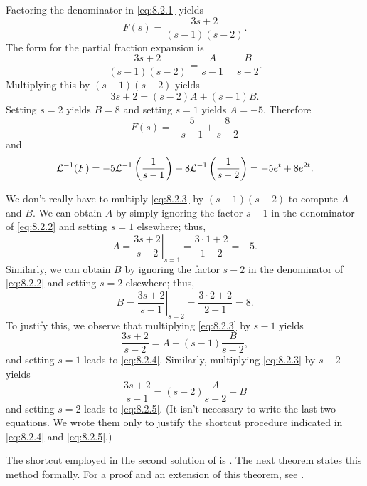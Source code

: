 \begin{enumext}[label=\arabic*,wrap-label={\scshape Solution (Method #1)},labelwidth=11em,list-indent=0pt]
\item
 Factoring the denominator in  \eqref{eq:8.2.1} yields
\begin{equation}\label{eq:8.2.2}
F(s)=\frac{3s+2}{(s-1)(s-2)}.
\end{equation}
The form for the partial fraction expansion is
\begin{equation}\label{eq:8.2.3}
\frac{3s+2}{(s-1)(s-2)}=\frac{A}{s-1}+\frac{B}{s-2}.
\end{equation}
Multiplying  this by $(s-1)(s-2)$ yields
\[
3s+2=(s-2)A+(s-1)B.
\]
Setting $s=2$ yields $B=8$ and setting $s=1$ yields $A=-5$. Therefore
\[
F(s)=-\frac{5}{s-1}+\frac{8}{s-2}
\]
and
\[
{\mathcal L}^{-1}(F)=-5{\mathcal L}^{-1}\left(\frac{1}{s-1}\right)
+8{\mathcal L}^{-1}\left(\frac{1}{s-2}\right)=-5e^t+8e^{2t}.
\]

\item
We don't really have to multiply  \eqref{eq:8.2.3} by $(s-1)(s-2)$
to compute $A$ and $B$. We can obtain $A$ by simply ignoring the factor
$s-1$ in the denominator of  \eqref{eq:8.2.2} and setting $s=1$ elsewhere;
thus,
\begin{equation}\label{eq:8.2.4}
A=\left.\frac{3s+2}{s-2}\right|_{s=1}=\frac{3\cdot1+2}{1-2}=-5.
\end{equation}
Similarly, we can obtain $B$ by ignoring the factor
$s-2$ in the denominator of  \eqref{eq:8.2.2} and setting $s=2$ elsewhere;
thus,
\begin{equation}\label{eq:8.2.5}
B=\left.\frac{3s+2}{s-1}\right|_{s=2}=\frac{3\cdot2+2}{2-1}=8.
\end{equation}
To justify this, we observe that multiplying  \eqref{eq:8.2.3} by $s-1$
yields
\[
\frac{3s+2}{s-2}=A+(s-1)\frac{B}{s-2},
\]
and setting $s=1$ leads to
\eqref{eq:8.2.4}. Similarly, multiplying  \eqref{eq:8.2.3} by $s-2$ yields
\[
\frac{3s+2}{s-1}=(s-2)\frac{A}{s-2}+B
\]
and setting $s=2$ leads to
\eqref{eq:8.2.5}.  (It isn't necessary to
 write the last two equations. We wrote them  only to justify
the shortcut procedure indicated in  \eqref{eq:8.2.4} and
\eqref{eq:8.2.5}.) \hfill\bbox
\end{enumext}

The shortcut employed in the second solution of
 is
.
The next theorem states this method formally. For a proof
and an extension of this theorem, see .

